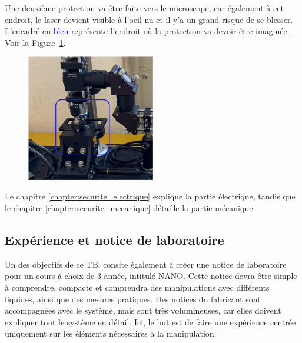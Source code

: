 \begin{minipage}{\textwidth}
    Une deuxième protection va être faite vers le microscope, car également à cet endroit, le laser devient visible à l'oeil nu et il y'a un grand risque de se blesser. L'encadré en \textcolor{blue}{bleu} représente l'endroit où la protection va devoir être imaginée. Voir la Figure~\ref{protection_laser_fin}.
    \vspace{1em}
    \begin{figure}[H]
        \begin{center}
            \includegraphics[width=0.5\textwidth]{assets/figures/Introduction/protection_fin_laser.png}
        \end{center}
        \label{protection_laser_fin}
    \end{figure}
\end{minipage}

\vspace{1em}
Le chapitre \ref{chapter:securite_electrique} explique la partie électrique, tandis que le chapitre \ref{chapter:securite_mecanique} détaille la partie mécanique.

\subsection{Expérience et notice de laboratoire}

Un des objectifs de ce TB, consite également à créer une notice de laboratoire pour un cours à choix de 3\ieme{} année, intitulé NANO. Cette notice devra être simple à comprendre, compacte et comprendra des manipulations avec différents liquides, ainsi que des mesures pratiques. Des notices du fabricant sont accompagnées avec le système, mais sont très volumineuses, car elles doivent expliquer tout le système en détail. Ici, le but est de faire une expérience centrée uniquement sur les éléments nécessaires à la manipulation.

